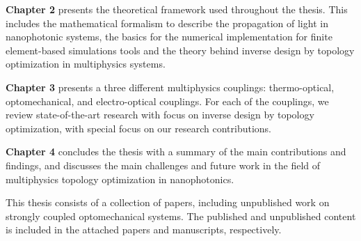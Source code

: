 \textbf{Chapter 2} presents the theoretical framework used throughout the thesis. This includes the mathematical formalism
to describe the propagation of light in nanophotonic systems, the basics for the numerical implementation for 
finite element-based simulations tools and the theory behind inverse design by topology optimization in multiphysics systems.

\textbf{Chapter 3} presents a three different multiphysics couplings: thermo-optical, optomechanical, and electro-optical couplings. For each
of the couplings, we review state-of-the-art research with focus on inverse design by topology optimization, with special focus on our
research contributions.

\textbf{Chapter 4} concludes the thesis with a summary of the main contributions and findings, and discusses the main challenges
and future work in the field of multiphysics topology optimization in nanophotonics.

This thesis consists of a collection of papers, including unpublished work on
strongly coupled optomechanical systems. The published and unpublished content is included in the attached
papers and manuscripts, respectively.